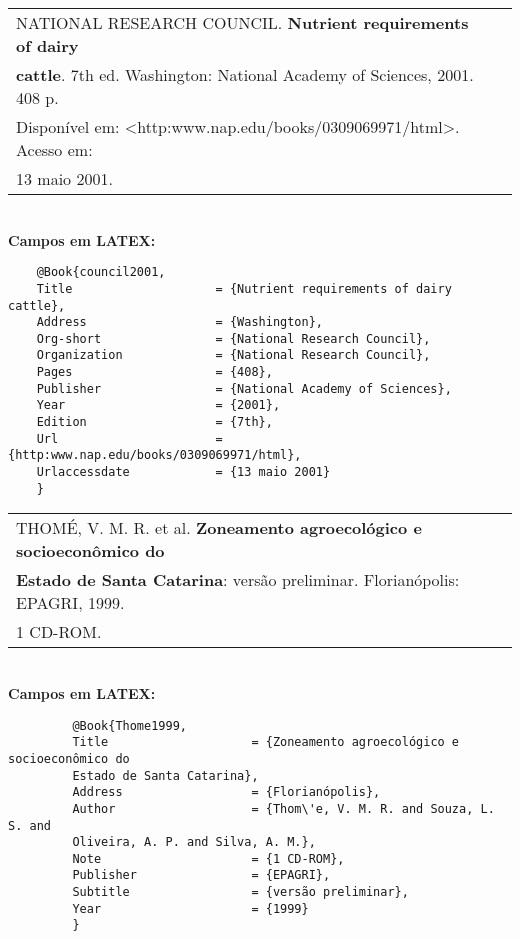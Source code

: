		 
\begin{tabular}{|l|c|} \hline
	NATIONAL RESEARCH COUNCIL. \textbf{Nutrient requirements of dairy } \\ \textbf{cattle}. 7th ed. Washington: National Academy of Sciences, 2001. 408 p.\\	Disponível em: <http:www.nap.edu/books/0309069971/html>. Acesso
	em:                                                                 \\13 maio 2001.   \\\hline
\end{tabular} \\ 
		 
\textbf{Campos em LATEX:} 
		 
\begingroup
\fontsize{10pt}{12pt}\selectfont
\begin{verbatim}
	@Book{council2001,
	Title                    = {Nutrient requirements of dairy cattle},
	Address                  = {Washington},
	Org-short                = {National Research Council},
	Organization             = {National Research Council},
	Pages                    = {408},
	Publisher                = {National Academy of Sciences},
	Year                     = {2001},
	Edition                  = {7th},
	Url                      = {http:www.nap.edu/books/0309069971/html},
	Urlaccessdate            = {13 maio 2001}
	}
\end{verbatim}
\endgroup
		 
		 
\begin{tabular}{|l|c|} \hline
	THOMÉ, V. M. R. et al. \textbf{Zoneamento agroecológico e socioeconômico do } \\ \textbf{Estado de Santa Catarina}:  versão preliminar. Florianópolis: EPAGRI, 1999. \\1 CD-ROM.  \\\hline
\end{tabular} \\ 
		 	 
\textbf{Campos em LATEX:} 
		 	 
\begingroup
\fontsize{10pt}{12pt}\selectfont
\begin{verbatim}
	 	 @Book{Thome1999,
	 	 Title                    = {Zoneamento agroecológico e socioeconômico do 
	 	 Estado de Santa Catarina},
	 	 Address                  = {Florianópolis},
	 	 Author                   = {Thom\'e, V. M. R. and Souza, L. S. and 
	 	 Oliveira, A. P. and Silva, A. M.},
	 	 Note                     = {1 CD-ROM},
	 	 Publisher                = {EPAGRI},
	 	 Subtitle                 = {versão preliminar},
	 	 Year                     = {1999}
	 	 }
\end{verbatim}
\endgroup
